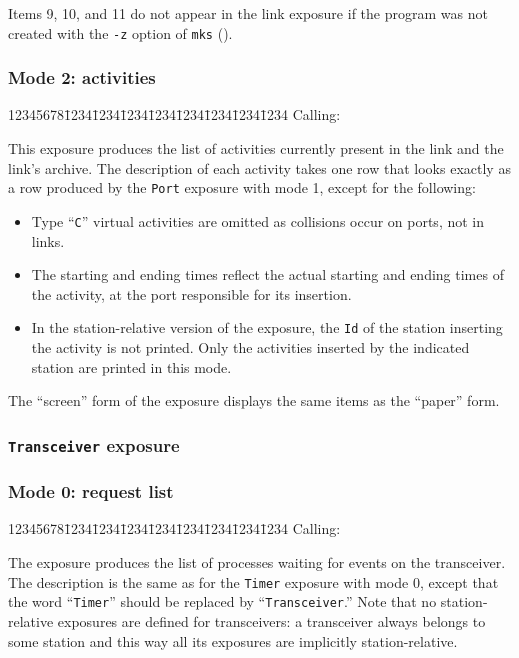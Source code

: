 Items 9, 10, and 11 do not appear in the link exposure if the program
was not created with the {\tt -z} option of {\tt mks}
().

\subsubsection*{Mode 2: activities}

{\tt\begin{tabbing}
12345678\=1234\=1234\=1234\=1234\=1234\=1234\=1234\=1234\kill
{\rm Calling:}
\end{tabbing}}

This exposure produces the list of activities currently present in the
link and the link's archive.
The description of each activity takes one row that looks exactly as a
row produced by the {\tt Port} exposure with mode 1, except for
the following:
\begin{itemize}
\item
Type ``{\tt C}'' virtual activities are omitted as collisions occur on
ports, not in links.
\item
The starting and ending times reflect the actual starting and ending times
of the activity, at the port responsible for its insertion.
\item
In the station-relative version of the exposure, the {\tt Id} of the
station inserting the activity is not printed.
Only the activities inserted by the indicated station are printed in this
mode.
\end{itemize}

The ``screen'' form of the exposure displays the same items as
the ``paper'' form.

\subsubsection{{\tt Transceiver} exposure}
\label{rm_ex_se_tv}

\subsubsection*{Mode 0: request list}

{\tt\begin{tabbing}
12345678\=1234\=1234\=1234\=1234\=1234\=1234\=1234\=1234\kill
{\rm Calling:}
\end{tabbing}}

The exposure produces the
list of processes waiting for events on the transceiver.
The description is the same as for the {\tt Timer} exposure
with mode 0, except that the word ``{\tt Timer}'' should be replaced by
``{\tt Transceiver}.''
Note that no station-relative exposures are defined for transceivers:
a transceiver
always belongs to some station and this way all its exposures are
implicitly station-relative.

